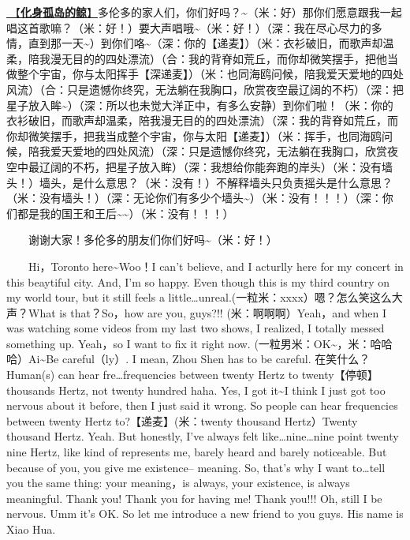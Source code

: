 \documentclass[]{ctexbook}
\begin{document}
\hyperref[hua-shen-gu-dao-de-jing]{🎵【\textbf{化身孤岛的鲸}】}多伦多的家人们，你们好吗？\textasciitilde（米：好）那你们愿意跟我一起唱这首歌嘛？（米：好！）要大声唱哦\textasciitilde（米：好！）（深：我在尽心尽力的多情，直到那一天\textasciitilde）到你们咯\textasciitilde（深：你的【递麦】）（米：衣衫破旧，而歌声却温柔，陪我漫无目的的四处漂流）（合：我的背脊如荒丘，而你却微笑摆手，把他当做整个宇宙，你与太阳挥手【深递麦】）（米：也同海鸥问候，陪我爱天爱地的四处风流）（合：只是遗憾你终究，无法躺在我胸口，欣赏夜空最辽阔的不朽）（深：把星子放入眸\textasciitilde）（深：所以也未觉大洋正中，有多么安静）到你们啦！（米：你的衣衫破旧，而歌声却温柔，陪我漫无目的的四处漂流）（深：我的背脊如荒丘，而你却微笑摆手，把我当成整个宇宙，你与太阳【递麦】）（米：挥手，也同海鸥问候，陪我爱天爱地的四处风流）（深：只是遗憾你终究，无法躺在我胸口，欣赏夜空中最辽阔的不朽，把星子放入眸）（深：我想给你能奔跑的岸头）（米：没有墙头！）墙头，是什么意思？（米：没有！）不解释墙头只负责摇头是什么意思？（米：没有墙头！）（深：无论你们有多少个墙头\textasciitilde）（米：没有！！！）（深：你们都是我的国王和王后\textasciitilde\textasciitilde）（米：没有！！！）

  谢谢大家！多伦多的朋友们你们好吗\textasciitilde（米：好！）

  Hi，Toronto here\textasciitilde Woo！I can't believe, and I acturlly here for my concert in this beaytiful city. And, I'm so happy. Even though this is my third country on my world tour, but it still feels a little\ldots unreal.(一粒米：xxxx）嗯？怎么笑这么大声？What is that？So，how are you, guys?!! (米：啊啊啊）Yeah，and when I was watching
some videos from my last two shows, I realized, I totally messed something up. Yeah，so I want to fix it right now. (一粒男米：OK\textasciitilde，米：哈哈哈）Ai\textasciitilde Be careful（ly）. I mean, Zhou Shen has to be careful. 在笑什么？Human(s) can hear fre\ldots frequencies between twenty Hertz to twenty【停顿】thousands Hertz, not twenty hundred haha. Yes, I got it\textasciitilde I think I just got too nervous about it before, then I just said it wrong. So people can hear frequencies between twenty Hertz to?【递麦】(米：twenty thousand Hertz）Twenty thousand Hertz. Yeah. But honestly, I've always felt like\ldots nine\ldots nine point twenty nine Hertz, like kind of represents me, barely heard and barely noticeable. But because of you, you give me existence-- meaning. So, that's why I want to\ldots tell you the same thing: your meaning，is always, your existence, is always meaningful. Thank you! Thank you for having me! Thank you!!! Oh, still I be nervous. Umm it's OK. So let me introduce a new friend to you guys. His name is Xiao Hua.
\end{document}
